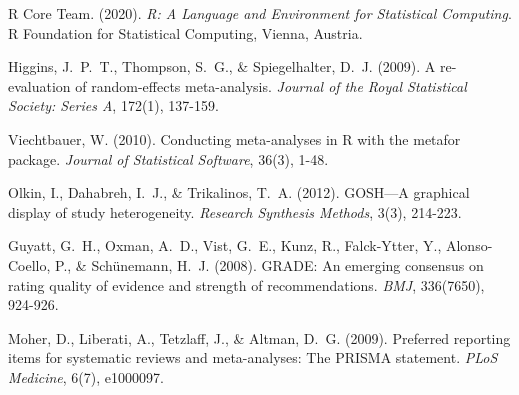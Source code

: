 \documentclass[12pt,a4paper]{report}
\begin{document}
\begin{thebibliography}{99}
R Core Team. (2020).
\newblock \textit{R: A Language and Environment for Statistical Computing}.
\newblock R Foundation for Statistical Computing, Vienna, Austria.

Higgins, J.~P.~T., Thompson, S.~G., \& Spiegelhalter, D.~J. (2009).
\newblock A re-evaluation of random-effects meta-analysis.
\newblock \textit{Journal of the Royal Statistical Society: Series A}, 172(1), 137-159.

Viechtbauer, W. (2010).
\newblock Conducting meta-analyses in R with the metafor package.
\newblock \textit{Journal of Statistical Software}, 36(3), 1-48.

Olkin, I., Dahabreh, I.~J., \& Trikalinos, T.~A. (2012).
\newblock GOSH—A graphical display of study heterogeneity.
\newblock \textit{Research Synthesis Methods}, 3(3), 214-223.

Guyatt, G.~H., Oxman, A.~D., Vist, G.~E., Kunz, R., Falck-Ytter, Y., Alonso-Coello, P., \& Schünemann, H.~J. (2008).
\newblock GRADE: An emerging consensus on rating quality of evidence and strength of recommendations.
\newblock \textit{BMJ}, 336(7650), 924-926.

Moher, D., Liberati, A., Tetzlaff, J., \& Altman, D.~G. (2009).
\newblock Preferred reporting items for systematic reviews and meta-analyses: The PRISMA statement.
\newblock \textit{PLoS Medicine}, 6(7), e1000097.


\end{thebibliography}
\end{document}
